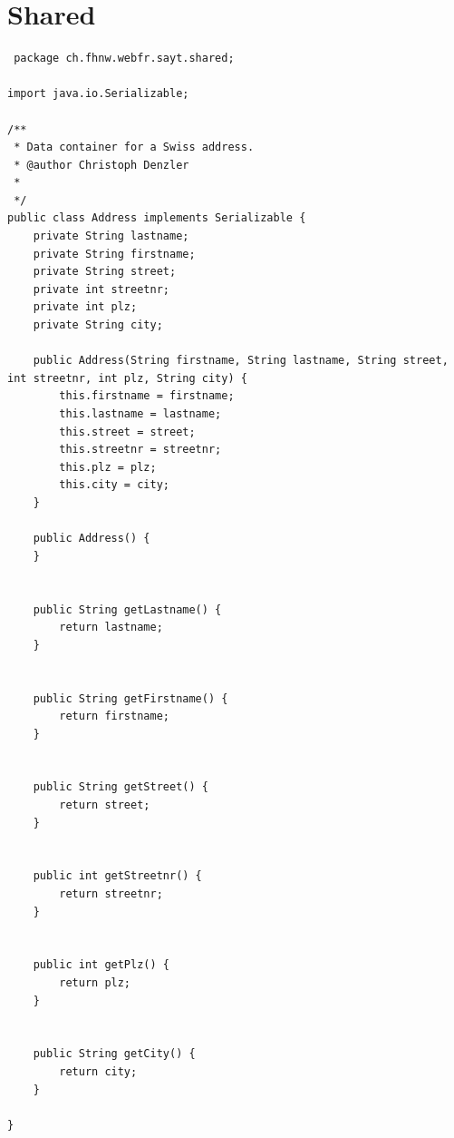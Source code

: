 \documentclass[a4paper,10pt]{scrreprt}
\begin{document}
\section{Shared}
\begin{lstlisting}
 package ch.fhnw.webfr.sayt.shared;

import java.io.Serializable;

/**
 * Data container for a Swiss address.
 * @author Christoph Denzler
 *
 */
public class Address implements Serializable {
	private String lastname;
	private String firstname;
	private String street;
	private int streetnr;
	private int plz;	
	private String city;	
	
	public Address(String firstname, String lastname, String street, int streetnr, int plz, String city) {
		this.firstname = firstname;
		this.lastname = lastname;
		this.street = street;
		this.streetnr = streetnr;
		this.plz = plz;
		this.city = city;		
	}
	
	public Address() {
	}
	
	
	public String getLastname() {
		return lastname;
	}


	public String getFirstname() {
		return firstname;
	}


	public String getStreet() {
		return street;
	}


	public int getStreetnr() {
		return streetnr;
	}


	public int getPlz() {
		return plz;
	}


	public String getCity() {
		return city;
	}

}
\end{lstlisting}
\end{document}
